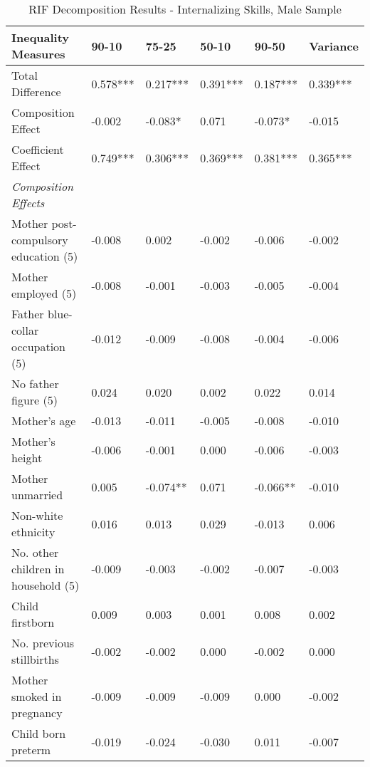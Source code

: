 \begin{table}[htbp]
  \centering
  \caption{RIF Decomposition Results - Internalizing Skills, Male Sample}\label{tab:RIF-INT-M}
\begingroup\footnotesize
\begin{tabular}{L{.3\textwidth}C{.085\textwidth}C{.085\textwidth}C{.085\textwidth}C{.085\textwidth}C{.085\textwidth}}
     \toprule
      \textbf{Inequality Measures}    & \textbf{90-10} & \textbf{75-25} & \textbf{50-10} & \textbf{90-50} & \textbf{Variance} \\
    \midrule
    Total Difference & 0.578*** & 0.217*** & 0.391*** & 0.187*** & 0.339*** \\
    Composition Effect & -0.002 & -0.083* & 0.071 & -0.073* & -0.015 \\
    Coefficient Effect & 0.749*** & 0.306*** & 0.369*** & 0.381*** & 0.365*** \\
    \textit{Composition Effects} &       &       &       &       &  \\
    Mother post-compulsory education (5) & -0.008 & 0.002 & -0.002 & -0.006 & -0.002 \\
    Mother employed (5) & -0.008 & -0.001 & -0.003 & -0.005 & -0.004 \\
    Father blue-collar occupation (5) & -0.012 & -0.009 & -0.008 & -0.004 & -0.006 \\
    No father figure (5) & 0.024 & 0.020 & 0.002 & 0.022 & 0.014 \\
    Mother's age & -0.013 & -0.011 & -0.005 & -0.008 & -0.010 \\
    Mother's height & -0.006 & -0.001 & 0.000 & -0.006 & -0.003 \\
    Mother unmarried & 0.005 & -0.074** & 0.071 & -0.066** & -0.010 \\
    Non-white ethnicity & 0.016 & 0.013 & 0.029 & -0.013 & 0.006 \\
    No. other children in household (5) & -0.009 & -0.003 & -0.002 & -0.007 & -0.003 \\
    Child firstborn & 0.009 & 0.003 & 0.001 & 0.008 & 0.002 \\
    No. previous stillbirths & -0.002 & -0.002 & 0.000 & -0.002 & 0.000 \\
    Mother smoked in pregnancy & -0.009 & -0.009 & -0.009 & 0.000 & -0.002 \\
    Child born preterm & -0.019 & -0.024 & -0.030 & 0.011 & -0.007 \\

\end{tabular}
\end{table}
